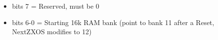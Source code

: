 \begin{itemize}
\item bits 7 = Reserved, must be 0
\item bits 6-0 = Starting 16k RAM bank (point to bank 11 after a Reset, NextZXOS
  modifies to 12)
\end{itemize}

